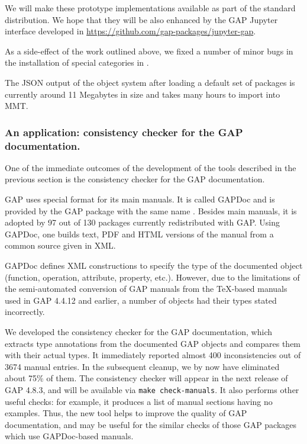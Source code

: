 We will make these prototype implementations available as part of the standard \GAP
distribution. We hope that they will be also enhanced by the GAP Jupyter interface developed in 
\url{https://github.com/gap-packages/jupyter-gap}.

As a side-effect of the work outlined above, we fixed a number of minor bugs in the installation
of special categories in \GAP.

The JSON output of the \GAP object system after loading a default set of packages is currently
around 11 Megabytes in size and takes many hours to import into MMT.



\subsubsection{An application: consistency checker for the GAP documentation.}\label{gap-types}

One of the immediate outcomes of the development of the tools described in the
previous section is the consistency checker for the GAP documentation. 

GAP uses special format for its main manuals. It is called GAPDoc and is 
provided by the GAP package with the same name \cite{gapdoc}. Besides main 
manuals, it is adopted by 97 out of 130 packages currently redistributed 
with GAP. Using GAPDoc, one builds text, PDF and HTML versions of the manual
from a common source given in XML.

GAPDoc defines XML constructions to specify the type of the documented object 
(function, operation, attribute, property, etc.). However, due to the 
limitations of the semi-automated conversion of GAP manuals from the \TeX-based
manuals used in GAP 4.4.12 and earlier, a number of objects had their types
stated incorrectly. 

We developed the consistency checker for the GAP documentation, which extracts
type annotations from the documented GAP objects and compares them with their
actual types. It immediately reported almost 400 inconsistencies out of 3674 
manual entries. In the subsequent cleanup, we by now have eliminated about 
75\% of them. The  consistency checker will appear in the next release of
GAP 4.8.3, and will be available via \texttt{make check-manuals}.
It also performs other useful checks: for example, it produces a list of
manual sections having no examples. Thus, the new tool helps to improve
the quality of GAP documentation, and may be useful for the similar checks
of those GAP packages which use GAPDoc-based manuals.


